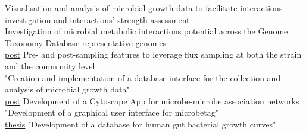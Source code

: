 \documentclass[
    a4paper,
]{fortysecondscv}
\begin{document}
\begin{cvtable}


    {\href{}{}}
    {Visualisation and analysis of microbial growth data to facilitate interactions investigation and interactions' strength assessment}{}\\


    {\href{}{}}
    {Investigation of microbial metabolic interactions potential across the Genome Taxonomy Database representative genomes
    }{}\\


    {\href{https://sotiristouliopoulos.github.io/dingo/}{post}}
    {Pre- and post-sampling features to leverage flux sampling at both the strain and the community level}{}\\

    {\href{}{}}
    {"Creation and implementation of a database interface for the collection and analysis of microbial growth data"}{}\\

    {\href{https://ermismd.github.io/MGG/}{post}}
    {Development of a Cytoscape App for microbe-microbe association networks
    }{}\\

    {\href{}{}}
    {"Development of a graphical user interface for microbetag"
    }\\

    {\href{https://kuleuven.limo.libis.be/discovery/fulldisplay?docid=alma9993527122501488&context=L&vid=32KUL_KUL:KULeuven&search_scope=All_Content&tab=all_content_tab&lang=en}{thesis}}
    {"Development of a database for human gut bacterial growth curves"
    }\\


\end{cvtable}
\end{document}
